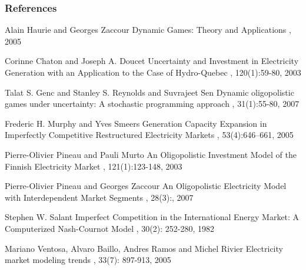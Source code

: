 \documentclass[mathserif,9pt]{beamer}
\begin{document}
\begin{frame}[allowframebreaks]
      \frametitle<presentation>{References}

      \begin{thebibliography}{8}

\beamertemplatebookbibitems
{}
Alain Haurie and Georges Zaccour
\newblock Dynamic Games: Theory and Applications
, 2005


\beamertemplatearticlebibitems

Corinne Chaton and Joseph A. Doucet
\newblock Uncertainty and Investment in Electricity Generation with an Application to the Case of Hydro-Quebec 
, 120(1):59-80, 2003
    
Talat S. Genc and Stanley S. Reynolds and Suvrajeet Sen
\newblock Dynamic oligopolistic games under uncertainty: A stochastic programming approach
, 31(1):55-80, 2007 

Frederic H. Murphy and Yves Smeers
\newblock Generation Capacity Expansion in Imperfectly Competitive Restructured Electricity Markets
, 53(4):646--661, 2005
	
Pierre-Olivier Pineau and Pauli Murto
\newblock An Oligopolistic Investment Model of the Finnish Electricity Market
, 121(1):123-148, 2003

Pierre-Olivier Pineau and Georges Zaccour
\newblock An Oligopolistic Electricity Model with Interdependent Market Segments
, 28(3):, 2007

Stephen W. Salant
\newblock Imperfect Competition in the International Energy Market: A Computerized Nash-Cournot Model , 30(2): 252-280, 1982

Mariano Ventosa, Alvaro Baillo, Andres Ramos and Michel Rivier
\newblock Electricity market modeling trends
, 33(7): 897-913, 2005

   \end{thebibliography}
\end{frame}
\end{document}
